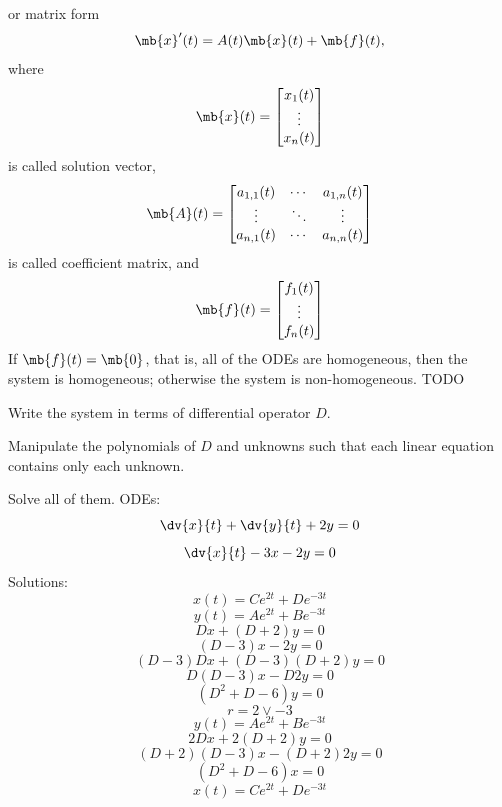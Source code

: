 \documentclass[a4paper,12pt]{report}
\begin{document}
or matrix form
\[\mb{x}'(t)=A(t)\mb{x}(t)+\mb{f}(t),\]
where
\[\mb{x}(t)=\begin{bmatrix}x_1(t)\\\vdots\\x_n(t)\end{bmatrix}\]
is called solution vector,
\[\mb{A}(t)=\begin{bmatrix}a_{1,1}(t) & \cdots & a_{1,n}(t)\\\vdots & \ddots & \vdots\\a_{n,1}(t) & \cdots & a_{n,n}(t)\end{bmatrix}\]
is called coefficient matrix, and
\[\mb{f}(t)=\begin{bmatrix}f_1(t)\\\vdots\\f_n(t)\end{bmatrix}\]
If $\mb{f}(t)=\mb{0}$, that is, all of the ODEs are homogeneous, then the system is homogeneous; otherwise the system is non-homogeneous.
TODO

\ben
\item Write the system in terms of differential operator $D$.
\item Manipulate the polynomials of $D$ and unknowns such that each linear equation contains only each unknown.
\item Solve all of them.
\een
{}
ODEs:
\[\dv{x}{t}+\dv{y}{t}+2y=0\]
\[\dv{x}{t}-3x-2y=0\]
Solutions:
\[x(t)=Ce^{2t}+De^{-3t}\]
\[y(t)=Ae^{2t}+Be^{-3t}\]
\bpr
\[Dx+(D+2)y=0\]
\[(D-3)x-2y=0\]
\[(D-3)Dx+(D-3)(D+2)y=0\]
\[D(D-3)x-D2y=0\]
\[(D^2+D-6)y=0\]
\[r=2\lor -3\]
\[y(t)=Ae^{2t}+Be^{-3t}\]
\[2Dx+2(D+2)y=0\]
\[(D+2)(D-3)x-(D+2)2y=0\]
\[(D^2+D-6)x=0\]
\[x(t)=Ce^{2t}+De^{-3t}\]
\epr
\end{document}
